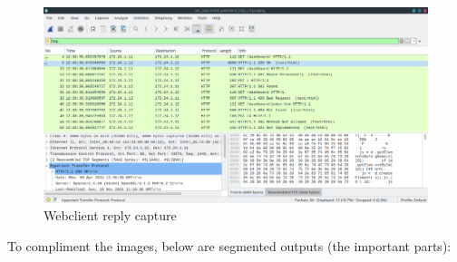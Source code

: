 \documentclass[11pt,a4paper]{report}
\begin{document}
\begin{flushleft}
\begin{flushleft}
                \begin{figure}
                    \centering
                    \includegraphics[scale=0.43]{phase1/images/wscapwcsocket06} %
                    \caption{Webclient reply capture} \label{fig:wireshark2}
                \end{figure}
            \end{flushleft}
            
            \clearpage
            To compliment the images, below are segmented outputs (the important parts):
        \end{flushleft}
\end{document}
